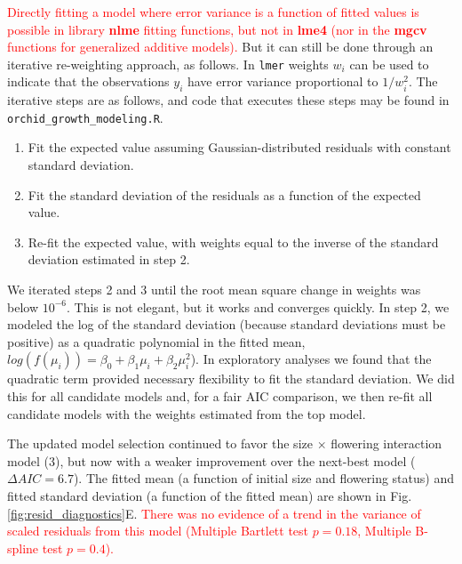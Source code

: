 \documentclass[12pt]{article}
\newcommand{\new}{\textcolor{red}}
\begin{document}
\new{Directly fitting a model where error variance is a function of fitted values is possible in library \textbf{nlme} fitting functions, but not in \textbf{lme4} (nor 
in the \textbf{mgcv} functions for generalized additive models). }
But it can still be done through an iterative re-weighting approach, as follows. 
In \texttt{lmer} weights $w_{i}$ can be used to indicate that the observations $y_{i}$ have error variance proportional to $1/w_i^2$. 
The iterative steps are as follows, and code that executes these steps may be found in \texttt{orchid\_growth\_modeling.R}. 
\begin{enumerate}
	\item Fit the expected value assuming Gaussian-distributed residuals with constant standard deviation. 
	\item Fit the standard deviation of the residuals as a function of the expected value. 
	\item Re-fit the expected value, with weights equal to the inverse of the standard deviation estimated in step 2. 
\end{enumerate}
We iterated steps 2 and 3 until the root mean square change in weights was below $10^{-6}$. This is not elegant, but it works and converges quickly. 
In step 2, we modeled the log of the standard deviation (because standard deviations must be positive) as a quadratic polynomial in the fitted mean, $log(f(\mu_{i}))=\beta_{0}+\beta_{1}\mu_{i}+\beta_{2}\mu_{i}^2$).  In exploratory analyses we found that the quadratic term provided necessary flexibility to fit the standard deviation. We did this for all candidate models and, for a fair AIC comparison, we then re-fit all candidate models with the weights estimated from the top model. 

The updated model selection continued to favor the size $\times$ flowering interaction model (3), but now with a weaker improvement over the next-best model ($\Delta AIC = 6.7$). 
The fitted mean (a function of initial size and flowering status) and fitted standard deviation (a function of the fitted mean) are shown in Fig. \ref{fig:resid_diagnostics}E. 
\new{There was no evidence of a trend in the variance of scaled residuals from this model (Multiple Bartlett test $p=0.18$, Multiple B-spline test $p=0.4$).}  
\end{document}
